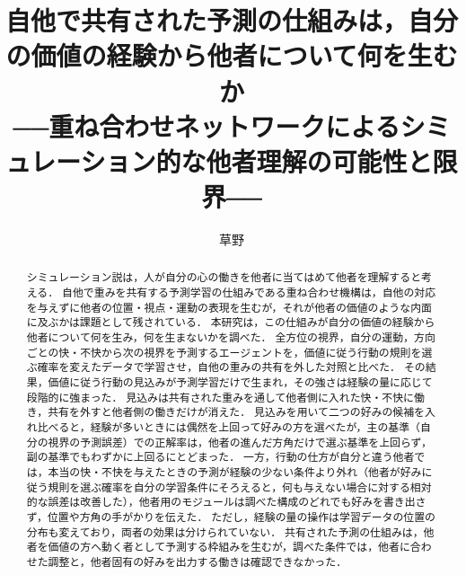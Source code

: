 \documentclass[uplatex,dvipdfmx,a4paper,11pt]{jsarticle}
\title{自他で共有された予測の仕組みは，自分の価値の経験から他者について何を生むか\\
\large ──重ね合わせネットワークによるシミュレーション的な他者理解の可能性と限界──}
\author{草野 \todo{【要確認：氏名・所属・共著者】}}
\date{}
\begin{document}
\maketitle

\begin{abstract}
シミュレーション説は，人が自分の心の働きを他者に当てはめて他者を理解すると考える．
自他で重みを共有する予測学習の仕組みである重ね合わせ機構は，自他の対応を与えずに他者の位置・視点・運動の表現を生むが，それが他者の価値のような内面に及ぶかは課題として残されている．
本研究は，この仕組みが自分の価値の経験から他者について何を生み，何を生まないかを調べた．
全方位の視界，自分の運動，方向ごとの快・不快から次の視界を予測するエージェントを，価値に従う行動の規則を選ぶ確率を変えたデータで学習させ，自他の重みの共有を外した対照と比べた．
その結果，価値に従う行動の見込みが予測学習だけで生まれ，その強さは経験の量に応じて段階的に強まった．
見込みは共有された重みを通して他者側に入れた快・不快に働き，共有を外すと他者側の働きだけが消えた．
見込みを用いて二つの好みの候補を入れ比べると，経験が多いときには偶然を上回って好みの方を選べたが，主の基準（自分の視界の予測誤差）での正解率は，他者の進んだ方角だけで選ぶ基準を上回らず，副の基準でもわずかに上回るにとどまった．
一方，行動の仕方が自分と違う他者では，本当の快・不快を与えたときの予測が経験の少ない条件より外れ（他者が好みに従う規則を選ぶ確率を自分の学習条件にそろえると，何も与えない場合に対する相対的な誤差は改善した），他者用のモジュールは調べた構成のどれでも好みを書き出さず，位置や方角の手がかりを伝えた．
ただし，経験の量の操作は学習データの位置の分布も変えており，両者の効果は分けられていない．
共有された予測の仕組みは，他者を価値の方へ動く者として予測する枠組みを生むが，調べた条件では，他者に合わせた調整と，他者固有の好みを出力する働きは確認できなかった．
\end{abstract}

\end{document}
